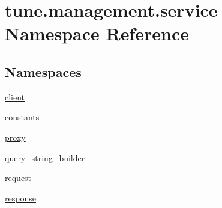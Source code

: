 \hypertarget{namespacetune_1_1management_1_1service}{\section{tune.\-management.\-service Namespace Reference}
\label{namespacetune_1_1management_1_1service}
}
\subsection*{Namespaces}
\begin{DoxyCompactItemize}
\item 
\hyperlink{namespacetune_1_1management_1_1service_1_1client}{client}
\item 
\hyperlink{namespacetune_1_1management_1_1service_1_1constants}{constants}
\item 
\hyperlink{namespacetune_1_1management_1_1service_1_1proxy}{proxy}
\item 
\hyperlink{namespacetune_1_1management_1_1service_1_1query__string__builder}{query\-\_\-string\-\_\-builder}
\item 
\hyperlink{namespacetune_1_1management_1_1service_1_1request}{request}
\item 
\hyperlink{namespacetune_1_1management_1_1service_1_1response}{response}
\end{DoxyCompactItemize}
